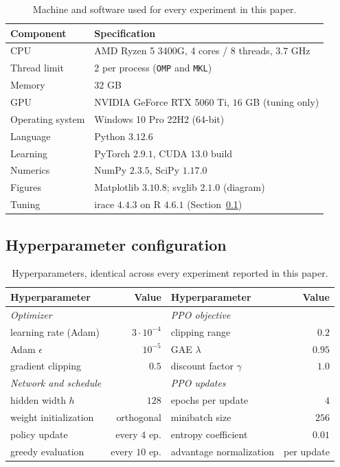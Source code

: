\documentclass[preprint,12pt]{elsarticle}
\theoremstyle{definition}
\theoremstyle{remark}
\begin{document}
\begin{table}[t]
\centering\small
\caption{Machine and software used for every experiment in this paper.}
\label{tab:environment}
\setlength{\tabcolsep}{4pt}
\begin{tabular}{ll}
\toprule
Component & Specification \\
\midrule
CPU & AMD Ryzen 5 3400G, 4 cores / 8 threads, $3.7$ GHz \\
Thread limit & 2 per process (\texttt{OMP} and \texttt{MKL}) \\
Memory & $32$ GB \\
GPU & NVIDIA GeForce RTX 5060 Ti, $16$ GB (tuning only) \\
Operating system & Windows 10 Pro 22H2 (64-bit) \\
\addlinespace
Language & Python $3.12.6$ \\
Learning & PyTorch $2.9.1$, CUDA $13.0$ build \\
Numerics & NumPy $2.3.5$, SciPy $1.17.0$ \\
Figures & Matplotlib $3.10.8$; svglib $2.1.0$ (diagram) \\
Tuning & irace $4.4.3$ on R $4.6.1$ (Section~\ref{sec:hyperconfig}) \\
\bottomrule
\end{tabular}
\end{table}

\subsection{Hyperparameter configuration}
\label{sec:hyperconfig}

\begin{table}[t]
\centering\small
\caption{Hyperparameters, identical across every experiment reported
in this paper.}
\label{tab:hyper}
\setlength{\tabcolsep}{4pt}
\begin{tabular}{lr@{\hskip 1.3em}|@{\hskip 1.3em}lr}
\toprule
Hyperparameter & Value & Hyperparameter & Value \\
\midrule
\textit{Optimizer} & & \textit{PPO objective} & \\
\quad learning rate (Adam) & $3\cdot10^{-4}$ &
  \quad clipping range & $0.2$ \\
\quad Adam $\epsilon$ & $10^{-5}$ &
  \quad GAE $\lambda$ & $0.95$ \\
\quad gradient clipping & $0.5$ &
  \quad discount factor $\gamma$ & $1.0$ \\
\addlinespace
\textit{Network and schedule} & & \textit{PPO updates} & \\
\quad hidden width $h$ & $128$ &
  \quad epochs per update & $4$ \\
\quad weight initialization & orthogonal &
  \quad minibatch size & $256$ \\
\quad policy update & every $4$ ep. &
  \quad entropy coefficient & $0.01$ \\
\quad greedy evaluation & every $10$ ep. &
  \quad advantage normalization & per update \\
\bottomrule
\end{tabular}
\end{table}
\end{document}
